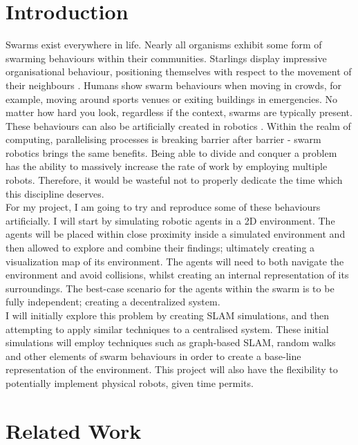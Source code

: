 \documentclass[12pt]{article}
\begin{document}
\section{Introduction}
Swarms exist everywhere in life. Nearly all organisms exhibit some form of swarming behaviours within their
communities. Starlings display impressive organisational behaviour, positioning themselves with respect to the
movement of their neighbours \cite{starling_swarm}. Humans show swarm behaviours when moving in crowds, for example, moving around sports
venues or exiting buildings in emergencies. No matter how hard you look, regardless if the context, swarms are
typically present.\\
These behaviours can also be artificially created in robotics \cite{intro_to_swarm}. Within the realm of computing, parallelising
processes is breaking barrier after barrier - swarm robotics brings the same benefits. Being able to divide and
conquer a problem has the ability to massively increase the rate of work by employing multiple robots. Therefore, it
would be wasteful not to properly dedicate the time which this discipline deserves.\\
For my project, I am going to try and reproduce some of these behaviours artificially. I will start by simulating robotic
agents in a 2D environment. The agents will be placed within close proximity inside a simulated environment and then allowed
to explore and combine their findings; ultimately creating a visualization map of its environment. The agents will need to
both navigate the environment and avoid collisions, whilst creating an internal representation of its surroundings. The
best-case scenario for the agents within the swarm is to be fully independent; creating a decentralized system.\\
I will initially explore this problem by creating SLAM simulations, and then attempting to apply similar techniques
to a centralised system. These initial simulations will employ techniques such as graph-based SLAM, random walks and other elements of
swarm behaviours in order to create a base-line representation of the environment. This project will also have the flexibility to
potentially implement physical robots, given time permits.\\


\section{Related Work}
\end{document}
